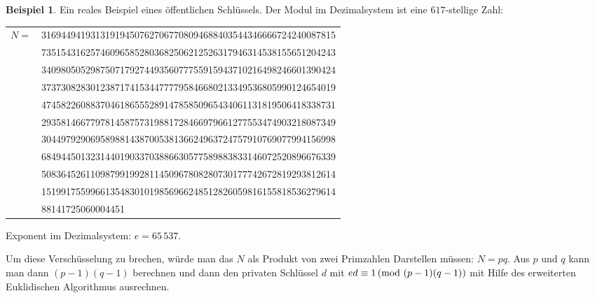 \documentclass[
a4paper,12pt,
bibliography=totocnumbered,
numbers=noenddot,
]{scrartcl}
\numberwithin{equation}{subsection}
\theoremstyle{plain}
\theoremstyle{definition}
\newtheorem*{bsp}{Beispiel}
\begin{document}
\begin{bsp}
	Ein reales Beispiel eines öffentlichen Schlüssels.  %
Der Modul im Dezimalsystem ist eine $617$-stellige Zahl: 
\begin{center}
\begin{tabular}{rl}
$N=$ &316944941931319194507627067708094688403544346666724240087815
\\&735154316257460965852803682506212526317946314538155651204243
\\&340980505298750717927449356077755915943710216498246601390424
\\&373730828301238717415344777795846680213349536805990124654019
\\&474582260883704618655528914785850965434061131819506418338731
\\&293581466779781458757319881728466979661277553474903218087349
\\&304497929069589881438700538136624963724757910769077994156998
\\&684944501323144019033703886630577589883833146072520896676339
\\&508364526110987991992811450967808280730177742672819293812614
\\&151991755996613548301019856966248512826059816155818536279614
\\&88141725060004451
\end{tabular}
\end{center} 

Exponent im Dezimalsystem: $e=65\,537$. 

Um diese Verschüsselung zu brechen, würde man das $N$ als Produkt von zwei Primzahlen Darstellen müssen: $N = pq$. Aus $p$ und $q$ kann man dann $(p-1)(q-1)$ berechnen und dann den privaten Schlüssel $d$ mit $e d \equiv 1 \,(\mathrm{mod} \ (p-1)(q-1))$ mit Hilfe des erweiterten Euklidischen Algorithmus ausrechnen. 
\end{bsp} 
\end{document}
